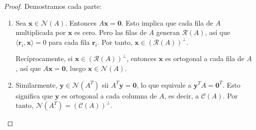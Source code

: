 \begin{proof}
Demostramos cada parte:
\begin{enumerate}
    \item Sea $\mathbf{x} \in \mathcal{N}(A)$. Entonces $A\mathbf{x} = \mathbf{0}$. Esto implica que cada fila de $A$ multiplicada por $\mathbf{x}$ es cero. Pero las filas de $A$ generan $\mathcal{R}(A)$, así que $\langle \mathbf{r}_i, \mathbf{x} \rangle = 0$ para cada fila $\mathbf{r}_i$. Por tanto, $\mathbf{x} \in (\mathcal{R}(A))^\perp$.
    
    Recíprocamente, si $\mathbf{x} \in (\mathcal{R}(A))^\perp$, entonces $\mathbf{x}$ es ortogonal a cada fila de $A$, así que $A\mathbf{x} = \mathbf{0}$, luego $\mathbf{x} \in \mathcal{N}(A)$.
    
    \item Similarmente, $\mathbf{y} \in \mathcal{N}(A^T)$ sii $A^T \mathbf{y} = \mathbf{0}$, lo que equivale a $\mathbf{y}^T A = \mathbf{0}^T$. Esto significa que $\mathbf{y}$ es ortogonal a cada columna de $A$, es decir, a $\mathcal{C}(A)$. Por tanto, $\mathcal{N}(A^T) = (\mathcal{C}(A))^\perp$.
\end{enumerate}
\end{proof}

